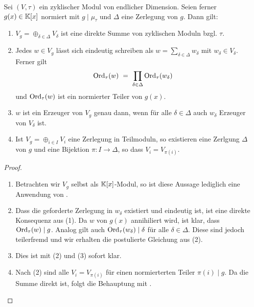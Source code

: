 \begin{satz}
  \label{satz:zerlegungssatz_zykl_vektorraume}
  Sei $(V,\tau)$ ein zyklischer Modul von endlicher Dimension. Seien ferner 
  $g(x) \in \mathbb{K}[x]$ normiert mit $g\mid \mu_\tau$ und $\Delta$ eine 
  Zerlegung von $g$. Dann gilt:
  \begin{enumerate}
    \item $V_g = \oplus_{\delta\in\Delta} V_\delta$ ist eine direkte Summe 
      von zyklischen Moduln bzgl. $\tau$.
    \item Jedes $w \in V_g$ lässt sich eindeutig schreiben als 
      $w = \sum_{\delta\in\Delta} w_\delta$ mit $w_\delta \in V_\delta$. Ferner
      gilt 
      \[ \operatorname{Ord}_\tau(w) \ =\  \prod_{\delta\in \Delta} \operatorname{Ord}_\tau(w_\delta)\]
      und $\operatorname{Ord}_\tau(w)$ ist ein normierter Teiler von $g(x)$.
    \item $w$ ist ein Erzeuger von $V_g$ genau dann, wenn für alle 
      $\delta\in\Delta$ auch $w_\delta$ Erzeuger von $V_\delta$ ist.
    \item Ist $V_g = \oplus_{i \in I} V_i$ eine Zerlegung in Teilmoduln,
      so existieren eine Zerlgung $\Delta$ von $g$ und 
      eine Bijektion $\pi:I\to\Delta$, so dass $V_i = V_{\pi(i)}$.
  \end{enumerate}
\end{satz}
\begin{proof}
  \begin{enumerate}
    \item Betrachten wir $V_g$ selbst als $\mathbb{K}[x]$-Modul, so ist diese Aussage
      lediglich eine Anwendung von .
    \item Dass die geforderte Zerlegung in $w_\delta$ existiert und eindeutig
      ist, ist eine direkte Konsequenz aus (1). Da $w$ von $g(x)$ annihiliert
      wird, ist klar, dass $\operatorname{Ord}_\tau(w) \mid g$. Analog gilt auch
      $\operatorname{Ord}_\tau(w_\delta)\mid \delta$ für alle $\delta \in \Delta$. Diese sind
      jedoch teilerfremd und wir erhalten die postulierte Gleichung aus
       (2).
    \item Dies ist mit (2) und  (3) sofort klar.
    \item Nach  (2) sind alle $V_i = V_{\pi(i)}$
      für einen normierterten Teiler $\pi(i) \mid g$. Da die Summe direkt ist,
      folgt die Behauptung mit .
  \end{enumerate}
\end{proof}


